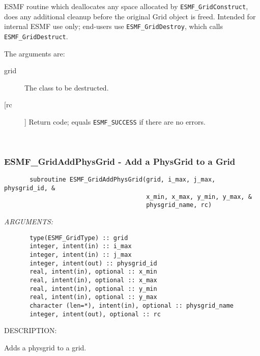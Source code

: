        ESMF routine which deallocates any space allocated by
      {\tt  ESMF\_GridConstruct}, does any additional cleanup before the
       original Grid object is freed.  Intended for internal ESMF
       use only; end-users use {\tt ESMF\_GridDestroy}, which calls
       {\tt ESMF\_GridDestruct}.  
  
       The arguments are:
       \begin{description}
       \item[grid]
            The class to be destructed.
       \item[[rc]]
            Return code; equals {\tt ESMF\_SUCCESS} if there are no errors.
       \end{description}
   
 
\mbox{}\hrulefill\ 
 
\subsubsection{ESMF\_GridAddPhysGrid - Add a PhysGrid to a Grid}


 
\begin{verbatim}       subroutine ESMF_GridAddPhysGrid(grid, i_max, j_max, physgrid_id, &
                                       x_min, x_max, y_min, y_max, &
                                       physgrid_name, rc)\end{verbatim}{\em ARGUMENTS:}
\begin{verbatim}       type(ESMF_GridType) :: grid
       integer, intent(in) :: i_max
       integer, intent(in) :: j_max
       integer, intent(out) :: physgrid_id
       real, intent(in), optional :: x_min
       real, intent(in), optional :: x_max
       real, intent(in), optional :: y_min
       real, intent(in), optional :: y_max
       character (len=*), intent(in), optional :: physgrid_name
       integer, intent(out), optional :: rc\end{verbatim}
{\sf DESCRIPTION:\\ }


       Adds a physgrid to a grid.
  
